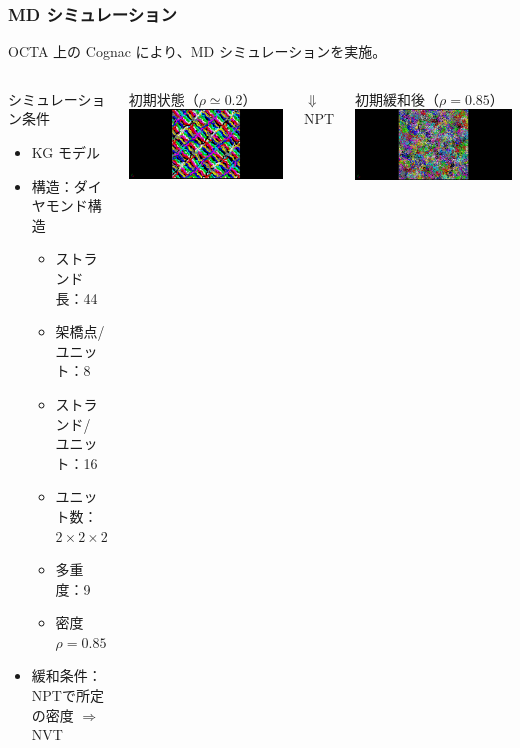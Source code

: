 \documentclass[11pt, dvipdfmx]{beamer}
\begin{document}
\begin{frame}
\frametitle{MD シミュレーション}

OCTA 上の Cognac により、MD シミュレーションを実施。

\begin{columns}[T, totalwidth=1\linewidth]
\begin{block}{シミュレーション条件}
	\begin{itemize}
	\item
	KG モデル
	\item
	構造：ダイヤモンド構造
	\begin{itemize}
		\item
		ストランド長：44
		\item
		架橋点/ ユニット：8
		\item
		ストランド/ ユニット：16
		\item
		ユニット数：$2 \times 2 \times 2$
		\item
		多重度：9
		\item
		密度 $\rho =0.85$
	\end{itemize}
	
	\item
	緩和条件：\\
	NPTで所定の密度 $\Rightarrow$ NVT
	\end{itemize} 
\end{block}
初期状態（$\rho \simeq 0.2$）
\includegraphics[width=\columnwidth]{./fig/Init.png}

\vspace{-3mm}
\begin{center}
$\Downarrow$ NPT
\end{center}
\vspace{-3mm}

初期緩和後（$\rho =0.85$）
\includegraphics[width=\columnwidth]{./fig/after.png}
\end{columns}
\end{frame}
\end{document}
